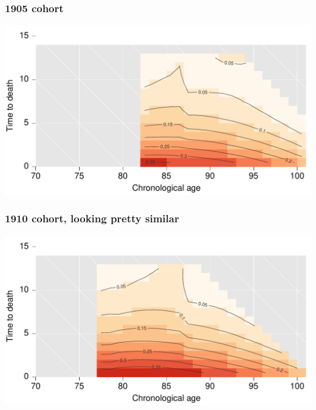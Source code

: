 \documentclass[20pt]{beamer}
\begin{document}

\begin{frame}
\frametitle{1905 cohort}
\vspace{-4em}
\begin{center}
\includegraphics[scale=1]{Figures/srhpoor1905.pdf}
\end{center}
\end{frame}


\begin{frame}
\frametitle{1910 cohort, looking pretty similar}
\vspace{-4em}
\begin{center}
\includegraphics[scale=1]{Figures/srhpoor1910.pdf}
\end{center}
\end{frame}

\end{document}
